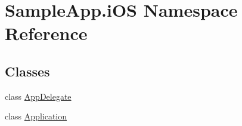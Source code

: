 \hypertarget{namespace_sample_app_1_1i_o_s}{}\section{Sample\+App.\+i\+OS Namespace Reference}
\label{namespace_sample_app_1_1i_o_s}
\subsection*{Classes}
\begin{DoxyCompactItemize}
\item 
class \hyperlink{class_sample_app_1_1i_o_s_1_1_app_delegate}{App\+Delegate}
\item 
class \hyperlink{class_sample_app_1_1i_o_s_1_1_application}{Application}
\end{DoxyCompactItemize}
